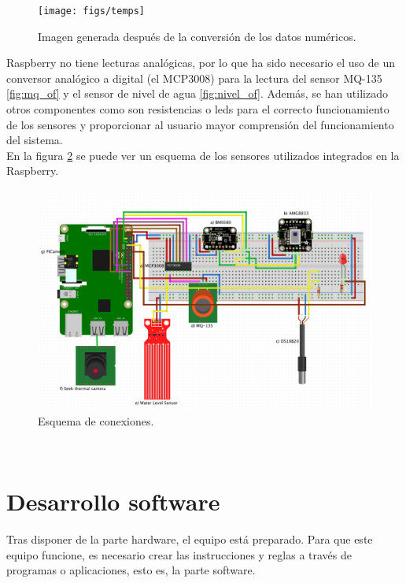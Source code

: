 \begin{figure} [h!]
  \begin{center}
    \texttt{[image: figs/temps]}
  \end{center}
  \caption{Imagen generada después de la conversión de los datos numéricos.}
  \label{fig:temps}
\end{figure}

Raspberry no tiene lecturas analógicas, por lo que ha sido necesario el uso de un conversor analógico a digital (el MCP3008) para la lectura del sensor MQ-135 \ref{fig:mq_of} y el sensor de nivel de agua \ref{fig:nivel_of}. Además, se han utilizado otros componentes como son resistencias o leds para el correcto funcionamiento de los sensores y proporcionar al usuario mayor comprensión del funcionamiento del sistema.\\

En la figura \ref{fig:esquema} se puede ver un esquema de los sensores utilizados integrados en la Raspberry.
\begin{figure} [h!]
  \begin{center}
    \includegraphics[width=14cm]{figs/esquema}
  \end{center}
  \caption{Esquema de conexiones.}
  \label{fig:esquema}
\end{figure}\\

\section{Desarrollo software}
Tras disponer de la parte hardware, el equipo está preparado. Para que este equipo funcione, es necesario crear las instrucciones y reglas a través de programas o aplicaciones, esto es, la parte software.\\

